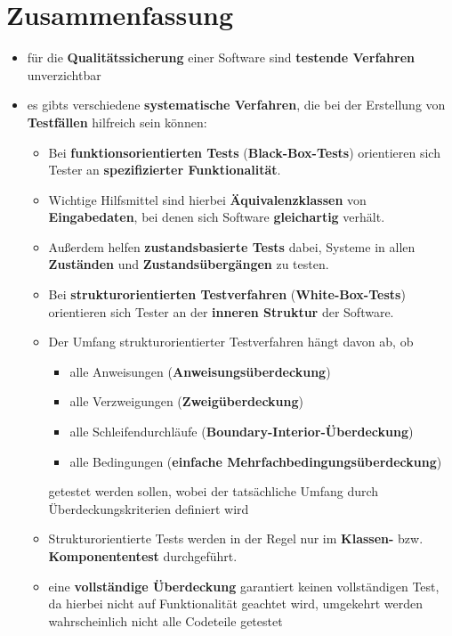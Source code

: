 \section{Zusammenfassung}

\begin{itemize}
    \item für die \textbf{Qualitätssicherung} einer Software sind \textbf{testende Verfahren} unverzichtbar
    \item es gibts verschiedene \textbf{systematische Verfahren}, die bei der Erstellung von \textbf{Testfällen} hilfreich sein können:
    \begin{itemize}
        \item Bei \textbf{funktionsorientierten Tests} (\textbf{Black-Box-Tests}) orientieren sich Tester an \textbf{spezifizierter Funktionalität}.
        \item[] Wichtige Hilfsmittel sind hierbei \textbf{Äquivalenzklassen} von \textbf{Eingabedaten}, bei denen sich Software \textbf{gleichartig} verhält.
        \item[] Außerdem helfen \textbf{zustandsbasierte Tests} dabei, Systeme in allen \textbf{Zuständen} und \textbf{Zustandsübergängen} zu testen.
        \item Bei \textbf{strukturorientierten Testverfahren} (\textbf{White-Box-Tests}) orientieren sich Tester an der \textbf{inneren Struktur} der Software.
        \item[] Der Umfang strukturorientierter Testverfahren hängt davon ab, ob
        \begin{itemize}
            \item alle Anweisungen (\textbf{Anweisungsüberdeckung})
            \item alle Verzweigungen (\textbf{Zweigüberdeckung})
            \item alle Schleifendurchläufe (\textbf{Boundary-Interior-Überdeckung})
            \item alle Bedingungen (\textbf{einfache Mehrfachbedingungsüberdeckung})
        \end{itemize}
        \noindent getestet werden sollen, wobei der tatsächliche Umfang durch Überdeckungskriterien  definiert wird
        \item[] Strukturorientierte Tests werden in der Regel nur im \textbf{Klassen-} bzw. \textbf{Komponententest} durchgeführt.
        \item eine \textbf{vollständige Überdeckung} garantiert keinen vollständigen Test, da hierbei nicht auf Funktionalität geachtet wird, umgekehrt werden wahrscheinlich nicht alle Codeteile getestet

\end{itemize}
\end{itemize}
